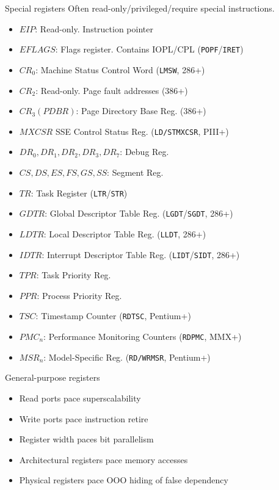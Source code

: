 \documentclass[mathserif,xcolor={dvipsnames,table}]{beamer}
\begin{document}
\begin{frame}{Special registers}
Often read-only/privileged/require special instructions.
\tiny{
\begin{itemize}
\item $EIP$: Read-only. Instruction pointer
\item $EFLAGS$: Flags register. Contains IOPL/CPL (\texttt{POPF}/\texttt{IRET})
\item $CR_0$: Machine Status Control Word (\texttt{LMSW}, 286+)
\item $CR_2$: Read-only. Page fault addresses (386+)
\item $CR_3 (PDBR)$: Page Directory Base Reg. (386+)
\item $MXCSR$ SSE Control Status Reg. (\texttt{LD/STMXCSR}, PIII+)
\item $DR_0, DR_1, DR_2, DR_3, DR_7$: Debug Reg.
\item $CS, DS, ES, FS, GS, SS$: Segment Reg.
\item $TR$: Task Register (\texttt{LTR}/\texttt{STR})
\item $GDTR$: Global Descriptor Table Reg. (\texttt{LGDT}/\texttt{SGDT}, 286+)
\item $LDTR$: Local Descriptor Table Reg. (\texttt{LLDT}, 286+)
\item $IDTR$: Interrupt Descriptor Table Reg. (\texttt{LIDT}/\texttt{SIDT}, 286+)
\item $TPR$: Task Priority Reg.
\item $PPR$: Process Priority Reg.
\item $TSC$: Timestamp Counter (\texttt{RDTSC}, Pentium+)
\item $PMC_n$: Performance Monitoring Counters (\texttt{RDPMC}, MMX+)
\item $MSR_n$: Model-Specific Reg. (\texttt{RD/WRMSR}, Pentium+)
\end{itemize}
}
\end{frame}

\begin{frame}{General-purpose registers}
\begin{itemize}
\item Read ports pace superscalability
\item Write ports pace instruction retire
\item Register width paces bit parallelism
\item Architectural registers pace memory accesses
\item Physical registers pace OOO hiding of false dependency
\end{itemize}
\end{frame}
\end{document}
